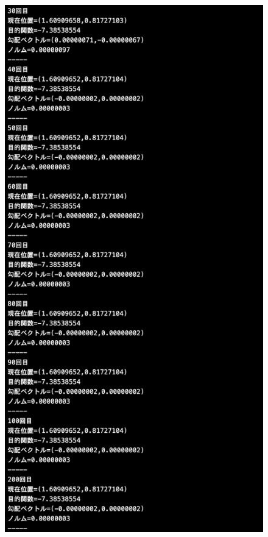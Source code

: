 \documentclass[12pt]{jarticle}
\begin{document}
\begin{figure}[h]
    \begin{minipage}{0.5\hsize}
        \begin{center}
            \includegraphics[scale=0.2]{kadai1_1s_out3_2_2.png}
        \end{center}

\end{minipage}
\end{figure}
\end{document}
